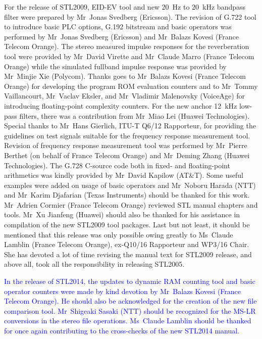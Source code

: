 For the release of STL2009, EID-EV tool and new 20~Hz to 20~kHz
bandpass filter were prepared by Mr~Jonas Svedberg (Ericsson). The
revision of G.722 tool to introduce basic PLC options, G.192 bitstream
and basic operators was performed by Mr~Jonas Svedberg (Ericsson) and
Mr~Balazs Kovesi (France Telecom Orange). The stereo measured impulse
responses for the reverberation tool were provided by Mr~David
Virette and Mr~Claude Marro (France Telecom Orange) while the
simulated fullband impulse response was provided by Mr~Minjie Xie
(Polycom). Thanks goes to Mr~Balazs Kovesi (France Telecom Orange)
for developing the program ROM evaluation counters and to Mr~Tommy
Vaillancourt, Mr~Vaclav Eksler, and Mr~Vladimir Malenovsky
(VoiceAge) for introducing floating-point complexity counters. For the
new anchor 12~kHz low-pass filters, there was a contribution from
Mr~Miao Lei (Huawei Technologies). Special thanks to Mr~Hans
Gierlich, ITU-T Q6/12 Rapporteur, for providing the guidelines on
test signals suitable for the frequency response measurement
tool. Revision of frequency response measurement tool was performed by
Mr~Pierre Berthet (on behalf of France Telecom Orange) and Mr~Deming
Zhang (Huawei Technologies). The G.728 C-source code both in fixed-
and floating-point arithmetics was kindly provided by Mr~David
Kapilow (AT\&T). Some useful examples were added on usage of basic
operators and Mr~Noboru Harada (NTT) and Mr~Karim Djafarian (Texas
Instruments) should be thanked for this work. Mr~Adrien Cormier
(France Telecom Orange) reviewed STL manual chapters and tools. Mr~Xu
Jianfeng (Huawei) should also be thanked for his assistance in
compilation of the new STL2009 tool packages. Last but not least, it
should be mentioned that this release was only possible owing greatly
to Ms~Claude Lamblin (France Telecom Orange), ex-Q10/16 Rapporteur
and WP3/16 Chair. She has devoted a lot of time revising the manual
text for STL2009 release, and above all, took all the responsibility
in releasing STL2005.

\textcolor{blue}{%
  In the release of STL2014, the updates to dynamic RAM counting tool
  and basic operator counters were made by kind devotion by Mr~Balazs
  Kovesi (France Telecom Orange). He should also be acknowledged for
  the creation of the new file comparison tool. Mr~Shigeaki Sasaki
  (NTT) should be recognized for the MS-LR conversions in the stereo
  file operations. Ms~Claude Lamblin should be thanked for once again
  contributing to the cross-checks of the new STL2014 manual.
%
}

